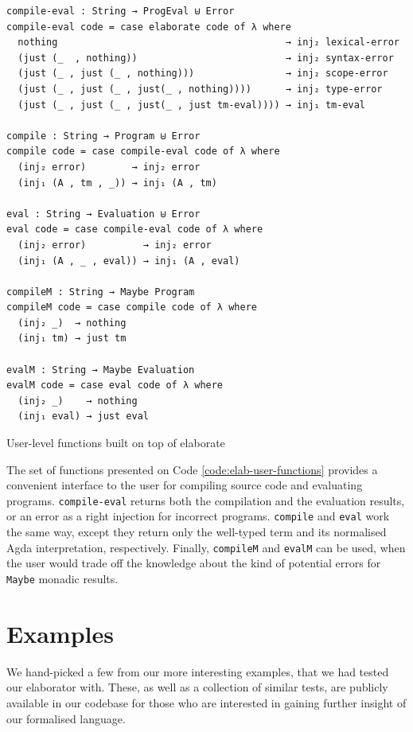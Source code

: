 \begin{listing}[H]
\begin{verbatim}
compile-eval : String → ProgEval ⊎ Error
compile-eval code = case elaborate code of λ where
  nothing                                        → inj₂ lexical-error
  (just (_  , nothing))                          → inj₂ syntax-error
  (just (_ , just (_ , nothing)))                → inj₂ scope-error
  (just (_ , just (_ , just(_ , nothing))))      → inj₂ type-error
  (just (_ , just (_ , just(_ , just tm-eval)))) → inj₁ tm-eval

compile : String → Program ⊎ Error
compile code = case compile-eval code of λ where
  (inj₂ error)        → inj₂ error
  (inj₁ (A , tm , _)) → inj₁ (A , tm)

eval : String → Evaluation ⊎ Error
eval code = case compile-eval code of λ where
  (inj₂ error)          → inj₂ error
  (inj₁ (A , _ , eval)) → inj₁ (A , eval)

compileM : String → Maybe Program
compileM code = case compile code of λ where
  (inj₂ _)  → nothing
  (inj₁ tm) → just tm

evalM : String → Maybe Evaluation
evalM code = case eval code of λ where
  (inj₂ _)    → nothing
  (inj₁ eval) → just eval
\end{verbatim}
\caption{User-level functions built on top of elaborate}
\label{code:elab-user-functions}
\end{listing}

The set of functions presented on Code \ref{code:elab-user-functions} provides a convenient interface to the user for compiling source code and evaluating programs. \verb$compile-eval$ returns both the compilation and the evaluation results, or an error as a right injection for incorrect programs. \verb$compile$ and \verb$eval$ work the same way, except they return only the well-typed term and its normalised Agda interpretation, respectively. Finally, \verb$compileM$ and \verb$evalM$ can be used, when the user would trade off the knowledge about the kind of potential errors for \verb$Maybe$ monadic results.

\section{Examples} \label{sec:examples}

We hand-picked a few from our more interesting examples, that we had tested our elaborator with. These, as well as a collection of similar tests, are publicly available in our codebase for those who are interested in gaining further insight of our formalised language.

